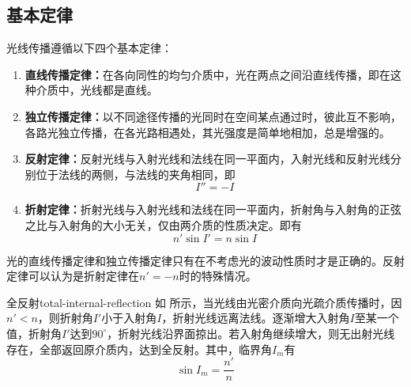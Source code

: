 \documentclass[cn,10pt,chinesefont=founder,math=mtpro2,cite=super,toc=onecol,twoside,openany]{elegantbook}
\begin{document}
\subsection{基本定律}
\label{subsect:basic-law}
光线传播遵循以下四个基本定律：
\begin{enumerate}
	\item \textbf{直线传播定律：}在各向同性的均匀介质中，光在两点之间沿直线传播，即在这种介质中，光线都是直线。
	\item \textbf{独立传播定律：}以不同途径传播的光同时在空间某点通过时，彼此互不影响，各路光独立传播，在各光路相遇处，其光强度是简单地相加，总是增强的。
	\item \textbf{反射定律：}反射光线与入射光线和法线在同一平面内，入射光线和反射光线分别位于法线的两侧，与法线的夹角相同，即
	\begin{equation}
	I''=-I
	\end{equation}
	\item \textbf{折射定律：}折射光线与入射光线和法线在同一平面内，折射角与入射角的正弦之比与入射角的大小无关，仅由两介质的性质决定。即有
	\begin{equation}
	n'\sin I'=n\sin I
	\end{equation}
\end{enumerate}

\begin{note}
	光的直线传播定律和独立传播定律只有在不考虑光的波动性质时才是正确的。反射定律可以认为是折射定律在$n'=-n$时的特殊情况。
\end{note}

\begin{definition}{全反射}{total-internal-reflection}
	如 所示，当光线由光密介质向光疏介质传播时，因$n'<n$，则折射角$I'$小于入射角$I$，折射光线远离法线。逐渐增大入射角$I$至某一个值，折射角$I'$达到$90^{\circ}$，折射光线沿界面掠出。若入射角继续增大，则无出射光线存在，全部返回原介质内，达到全反射。其中，临界角$I_m$有
	\begin{equation}
	\sin I_m=\frac{n'}{n}
	\end{equation}
\end{definition}
\end{document}
